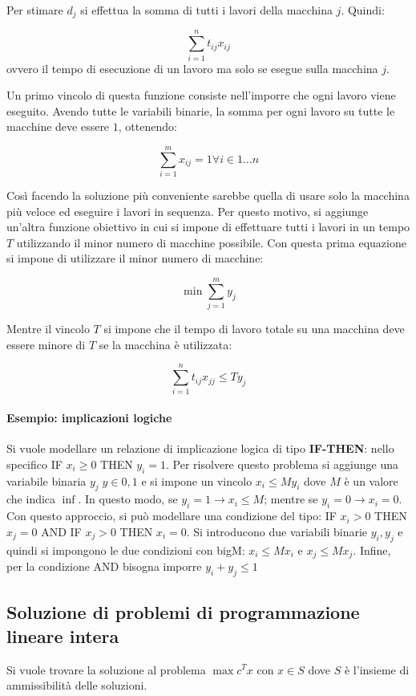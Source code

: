 \documentclass{article}
\begin{document}
Per stimare $d_j$ si effettua la somma di tutti i lavori della macchina $j$. 
Quindi:

$$\sum_{i=1}^n t_{ij}x_{ij}$$
ovvero il tempo di esecuzione di un lavoro ma solo se esegue sulla macchina $j$.

Un primo vincolo di questa funzione consiste nell'imporre che ogni lavoro viene 
eseguito. Avendo tutte le variabili binarie, la somma per ogni lavoro su tutte 
le macchine deve essere $1$, ottenendo:

\begin{equation*}
  \sum_{i=1}^m x_{ij} = 1 \forall i \in {1...n}
\end{equation*}

Così facendo la soluzione più conveniente sarebbe quella di usare solo la 
macchina più veloce ed eseguire i lavori in sequenza. Per questo motivo, 
si aggiunge un'altra funzione obiettivo in cui si impone di effettuare tutti 
i lavori in un tempo $T$ utilizzando il minor numero di macchine possibile.
Con questa prima equazione si impone di utilizzare il minor numero di macchine:

$$\min \sum_{j=1}^m y_j$$

Mentre il vincolo $T$ si impone che il tempo di lavoro totale su una macchina 
deve essere minore di $T$ se la macchina è utilizzata:


$$\sum_{i=1}^n  t_{ij} x_{jj} \leq T y_j$$

\paragraph{Esempio: implicazioni logiche}
Si vuole modellare un relazione di implicazione logica di tipo 
\textbf{IF-THEN}: nello specifico IF $x_i \geq 0$ THEN $y_i = 1$. Per risolvere
questo problema si aggiunge una variabile binaria $y_j\; y \in {0,1}$ e si 
impone un vincolo $x_i \leq My_i$ dove $M$ è un valore che indica $\inf$. In 
questo modo, se $y_i = 1 \rightarrow x_i \leq M$; mentre se $y_i = 0 
\rightarrow x_i = 0$.\\ 
Con questo approccio, si può modellare una condizione del tipo:
IF $x_i > 0$ THEN $x_j = 0$ AND IF $x_j > 0$  THEN $x_i = 0$.
Si introducono due variabili binarie $y_i,y_j$ e quindi si impongono le 
due condizioni con bigM: $x_i \leq Mx_i$ e $x_j \leq Mx_j$. Infine, per la 
condizione AND bisogna imporre $y_i+y_j \leq 1$

\subsection{Soluzione di problemi di programmazione lineare intera}
Si vuole trovare la soluzione al problema $\max c^Tx$ con $x\in S$ dove $S$ è 
l'insieme di ammissibilità delle soluzioni.
\end{document}
